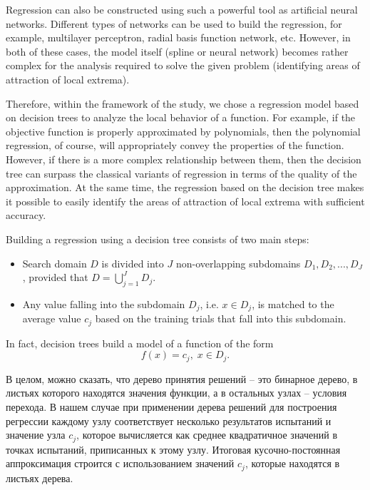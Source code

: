 \documentclass[entropy,article,submit,moreauthors,pdftex]{Definitions/mdpi}
\begin{document}
Regression can also be constructed using such a powerful tool as artificial neural networks. 
Different types of networks can be used to build the regression, for example, multilayer perceptron, radial basis function network, etc.
However, in both of these cases, the model itself (spline or neural network) becomes rather complex for the analysis required to solve the given problem (identifying areas of attraction of local extrema).

Therefore, within the framework of the study, we chose a regression model based on decision trees to analyze the local behavior of a function.
For example, if the objective function is properly approximated by polynomials, then the polynomial regression, of course, will appropriately convey the properties of the function. However, if there is a more complex relationship between them, then the decision tree can surpass the classical variants of regression in terms of the quality of the approximation. 
At the same time, the regression based on the decision tree makes it possible to easily identify the areas of attraction of local extrema with sufficient accuracy.

Building a regression using a decision tree consists of two main steps:
\begin{itemize}
	\item Search domain $D$ is divided into $J$ non-overlapping subdomains  $D_1, D_2, ..., D_J$, provided that $D = \bigcup_{j=1}^{J}{D_j}$.
	\item Any value falling into the subdomain $D_j$, i.e. $x \in D_j$, is matched to the average value  $c_j$ based on the training trials that fall into this subdomain. 
\end{itemize}
In fact, decision trees build a model of a function of the form
\begin{equation}\label{dtree}
f(x) = c_j, \; x\in D_j.
\end{equation}

В целом, можно сказать, что дерево принятия решений -- это бинарное дерево, в листьях которого находятся значения функции, а в остальных узлах -- условия перехода.
В нашем случае при применении дерева решений для построения регрессии каждому узлу соответствует несколько результатов испытаний и значение узла $c_j$, которое вычисляется как среднее квадратичное значений в точках испытаний, приписанных к этому узлу.
Итоговая кусочно-постоянная аппроксимация строится с использованием значений $c_j$, которые находятся в листьях дерева. 
\end{document}
